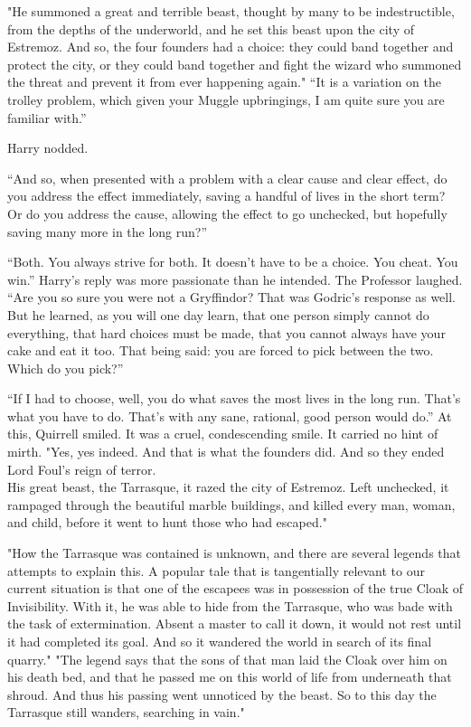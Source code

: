 "He summoned a great and terrible beast, thought by many to be indestructible, from the depths of the underworld, and he set this beast upon the city of Estremoz. And so, the four founders had a choice: they could band together and protect the city, or they could band together and fight the wizard who summoned the threat and prevent it from ever happening again."
\SmallVSpace
“It is a variation on the trolley problem, which given your Muggle upbringings, I am quite sure you are familiar with.”

Harry nodded.

“And so, when presented with a problem with a clear cause and clear effect, do you address the effect immediately, saving a handful of lives in the short term? Or do you address the cause, allowing the effect to go unchecked, but hopefully saving many more in the long run?”

“Both. You always strive for both. It doesn’t have to be a choice. You cheat. You win.” Harry’s reply was more passionate than he intended.
\SmallVSpace
The Professor laughed. “Are you so sure you were not a Gryffindor? That was Godric’s response as well. But he learned, as you will one day learn, that one person simply cannot do everything, that hard choices must be made, that you cannot always have your cake and eat it too. That being said: you are forced to pick between the two. Which do you pick?”

“If I had to choose, well, you do what saves the most lives in the long run. That’s what you have to do. That’s with any sane, rational, good person would do.”
\SmallVSpace
At this, Quirrell smiled. It was a cruel, condescending smile. It carried no hint of mirth. "Yes, yes indeed. And that is what the founders did. And so they ended Lord Foul’s reign of terror.\\His great beast, the Tarrasque, it razed the city of Estremoz. Left unchecked, it rampaged through the beautiful marble buildings, and killed every man, woman, and child, before it went to hunt those who had escaped."

"How the Tarrasque was contained is unknown, and there are several legends that attempts to explain this. A popular tale that is tangentially relevant to our current situation is that one of the escapees was in possession of the true Cloak of Invisibility. With it, he was able to hide from the Tarrasque, who was bade with the task of extermination. Absent a master to call it down, it would not rest until it had completed its goal. And so it wandered the world in search of its final quarry."
\SmallVSpace
"The legend says that the sons of that man laid the Cloak over him on his death bed, and that he passed me on this world of life from underneath that shroud. And thus his passing went unnoticed by the beast. So to this day the Tarrasque still wanders, searching in vain."

